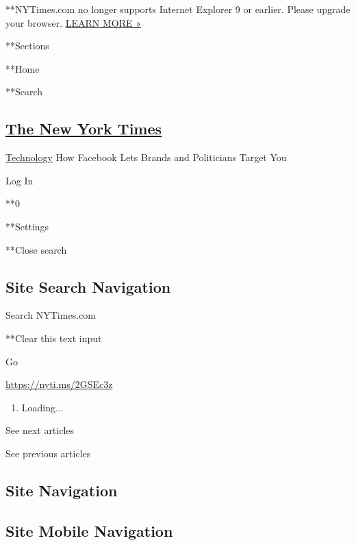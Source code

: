 **NYTimes.com no longer supports Internet Explorer 9 or earlier. Please
upgrade your browser.
\href{http://www.nytimes3xbfgragh.onion/content/help/site/ie9-support.html}{LEARN
MORE »}

**Sections

**Home

**Search

\hypertarget{the-new-york-times}{%
\subsection{\texorpdfstring{\href{http://www.nytimes3xbfgragh.onion/}{The
New York Times}}{The New York Times}}\label{the-new-york-times}}

\href{https://www.nytimes3xbfgragh.onion/section/technology}{Technology}
\textbar{}How Facebook Lets Brands and Politicians Target You

Log In

**0

**Settings

**Close search

\hypertarget{site-search-navigation}{%
\subsection{Site Search Navigation}\label{site-search-navigation}}

Search NYTimes.com

**Clear this text input

Go

\href{https://nyti.ms/2GSEc3z}{https://nyti.ms/2GSEc3z}

\begin{enumerate}
\def\labelenumi{\arabic{enumi}.}
\item
  Loading...
\end{enumerate}

See next articles

See previous articles

\hypertarget{site-navigation}{%
\subsection{Site Navigation}\label{site-navigation}}

\hypertarget{site-mobile-navigation}{%
\subsection{Site Mobile Navigation}\label{site-mobile-navigation}}

